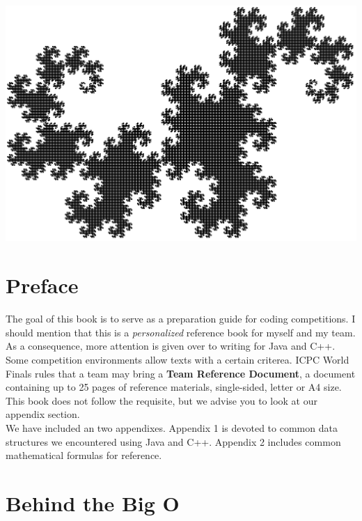 \documentclass[]{book}
\author{}
\title{}
\date{}
\begin{document}
  \frontmatter
  \thispagestyle{empty}
  \begin{center}
    \includegraphics[scale=0.17]{dragon16.png}
  \end{center}
  \clearpage
  \tableofcontents
  \thispagestyle{empty}

  \chapter*{Preface}
  \indent The goal of this book is to serve as a preparation guide for coding competitions.
  I should mention that this is a \textit{personalized} reference book for myself and my team.
  As a consequence, more attention is given over to writing for Java and C++.\\
  \indent Some competition environments allow texts with a certain criterea. ICPC World Finals
  rules that a team may bring a \textbf{Team Reference Document}, a document containing up to
  25 pages of reference materials, single-sided, letter or A4 size. This book does not
  follow the requisite, but we advise you to look at our appendix section.\\
  \indent We have included an two appendixes. Appendix 1 is devoted to common data structures we
  encountered using Java and C++. Appendix 2 includes common mathematical formulas for reference.
  \restoregeometry  %

  \mainmatter
  \chapter{Behind the Big O}
\end{document}
